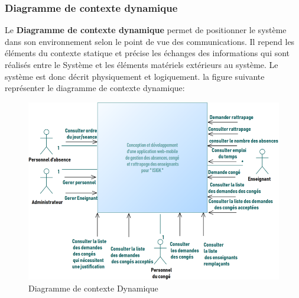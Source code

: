 \documentclass[12 pt]{report}
\begin{document}
\subsubsection{ Diagramme de contexte dynamique }
Le \textbf{Diagramme de contexte dynamique} permet de positionner le système dans son environnement selon le point de vue des communications. Il repend les éléments du contexte statique et précise les échanges des informations qui sont réalisés entre le 
Système et les éléments matériels extérieurs au système. Le système est donc décrit physiquement et logiquement.
\newpage
la figure suivante représenter le diagramme de contexte dynamique:
\begin{figure}[h]
\begin{center}

\includegraphics[width= 16 cm ,height= 12 cm]{d.png}
\caption{ Diagramme de contexte Dynamique}
\end{center}

\end{figure}
\end{document}
